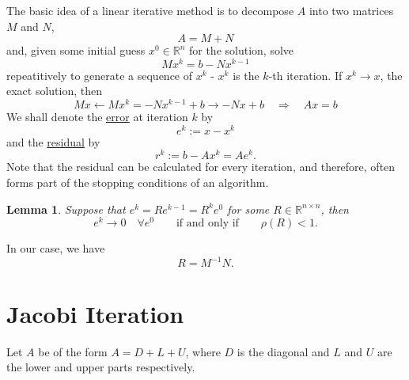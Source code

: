 \documentclass[a4paper,10pt,oneside]{book}
\theoremstyle{plain}%
\newtheorem{lem}[thm]{Lemma}
\theoremstyle{definition}
\theoremstyle{remark}
\newcommand{\bbR}{\mathbb{R}}
\begin{document}
The basic idea of a linear iterative method is to decompose $A$ into two
matrices $M$ and $N$,
\begin{equation}A=M+N\label{SLE.decomp}\end{equation}
and, given some initial guess $x^0\in\bbR^n$ for the solution, solve
\begin{equation}
 Mx^k=b-Nx^{k-1}
\end{equation}
repeatitively to generate a sequence of $x^k$ - $x^k$ is the $k$-th iteration.
If $x^k\to x$, the exact solution, then
\begin{equation}
 Mx\leftarrow Mx^k=-Nx^{k-1}+b\to-Nx+b\quad\Rightarrow\quad Ax=b
\end{equation}
We shall denote the \underline{error} at iteration $k$ by \[e^k:=x-x^k\] and the
\underline{residual} by \[r^k:=b-Ax^k=Ae^k.\]
Note that the residual can be calculated for every iteration, and therefore,
often forms part of the stopping conditions of an algorithm.

\begin{lem}
 Suppose that $e^k=Re^{k-1}=R^ke^0$ for some $R\in\bbR^{n\times n}$, then
 \begin{equation}
  e^k\to0\quad\forall e^0\qquad\text{if and only if}\qquad\rho(R)<1.
 \end{equation}
\end{lem}

In our case, we have \[R=M^{-1}N.\]

\section{Jacobi Iteration}
Let $A$ be of the form $A=D+L+U$, where $D$ is the diagonal and $L$ and $U$ are
the lower and upper parts respectively.
\end{document}
